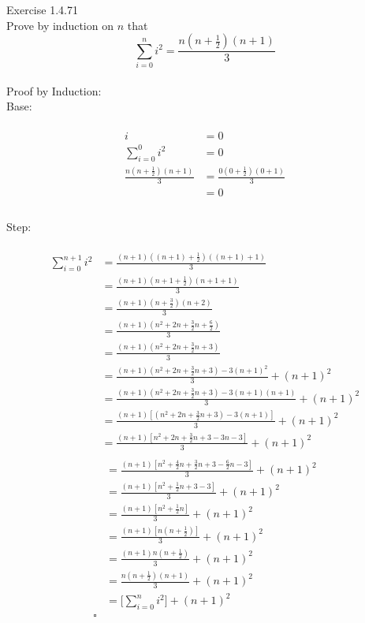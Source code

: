 \documentclass{article}
\begin{document}
	Exercise 1.4.71\\
	Prove by induction on $n$ that 
	$$ \sum_{i=0}^{n}{i^2} = \frac{n(n+\frac{1}{2})(n+1)}{3}$$
	\\
	Proof by Induction:
	\\
	Base:\\
	\\
	\begin{align*}
		i &= 0\\
		\sum_{i=0}^{0}{i^2} &= 0\\
		\frac{n(n+\frac{1}{2})(n+1)}{3}	&= \frac{0(0+\frac{1}{2})(0+1)}{3}\\
		&= 0\\
	\end{align*}
	\\
	Step:\\
	\\
	\begin{align*}
		\sum_{i=0}^{n+1}{i^2} &= \frac{(n+1)((n+1)+\frac{1}{2})((n+1)+1)}{3}\\
		&=\frac{(n+1)(n+1+\frac{1}{2})(n+1+1)}{3}\\
		&=\frac{(n+1)(n+\frac{3}{2})(n+2)}{3}\\
		&=\frac{(n+1)(n^2+2n+\frac{3}{2}n+\frac{6}{2})}{3}\\
		&=\frac{(n+1)(n^2+2n+\frac{3}{2}n+3)}{3}\\
		&=\frac{(n+1)(n^2+2n+\frac{3}{2}n+3)-3(n+1)^2}{3}+(n+1)^2\\
		&=\frac{(n+1)(n^2+2n+\frac{3}{2}n+3)-3(n+1)(n+1)}{3}+(n+1)^2\\		
		&=\frac{(n+1)[(n^2+2n+\frac{3}{2}n+3)-3(n+1)]}{3}+(n+1)^2\\				
		&=\frac{(n+1)[n^2+2n+\frac{3}{2}n+3-3n-3]}{3}+(n+1)^2\\				
	\end{align*}
	\begin{align*}		
		&=\frac{(n+1)[n^2+\frac{4}{2}n+\frac{3}{2}n+3-\frac{6}{2}n-3]}{3}+(n+1)^2\\								
		&=\frac{(n+1)[n^2+\frac{1}{2}n+3-3]}{3}+(n+1)^2\\				
		&=\frac{(n+1)[n^2+\frac{1}{2}n]}{3}+(n+1)^2\\						
		&=\frac{(n+1)[n(n+\frac{1}{2})]}{3}+(n+1)^2\\		
		&=\frac{(n+1)n(n+\frac{1}{2})}{3}+(n+1)^2\\		
		&=\frac{n(n+\frac{1}{2})(n+1)}{3}+(n+1)^2\\	
		&=\bigg[\sum_{i=0}^{n}{i^2}\bigg]+(n+1)^2\\
		\square					
	\end{align*}
\end{document}
